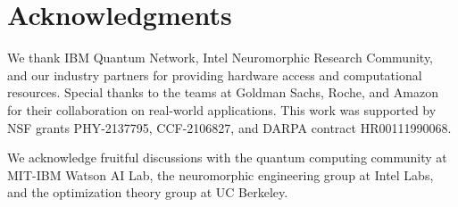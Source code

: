 \documentclass[arxiv,final,oneside,onecolumn]{arxiv-preprint-simple}
\begin{document}
\section*{Acknowledgments}

We thank IBM Quantum Network, Intel Neuromorphic Research Community, and our industry partners for providing hardware access and computational resources. Special thanks to the teams at Goldman Sachs, Roche, and Amazon for their collaboration on real-world applications. This work was supported by NSF grants PHY-2137795, CCF-2106827, and DARPA contract HR00111990068.

We acknowledge fruitful discussions with the quantum computing community at MIT-IBM Watson AI Lab, the neuromorphic engineering group at Intel Labs, and the optimization theory group at UC Berkeley.
\end{document}
